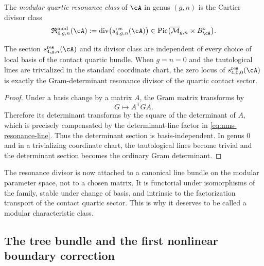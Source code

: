 \begin{definition}
\label{def:nms-modular-quartic-resonance-class}
The \emph{modular quartic resonance class} of $\cA$ in genus $(g,n)$ is the Cartier divisor class
\begin{equation}
\label{eq:nms-modular-resonance-class}
\mathfrak R_{4,g,n}^{\mathrm{mod}}(\cA)
:=
\operatorname{div}\bigl(s_{4,g,n}^{\mathrm{res}}(\cA)\bigr)
\in
\operatorname{Pic}\bigl(\overline{\mathcal M}_{g,n}\times B_{\cA}^{\circ}\bigr).
\end{equation}
\end{definition}

\begin{proposition}
\label{prop:nms-basis-independence-specialization}
The section $s_{4,g,n}^{\mathrm{res}}(\cA)$ and its divisor class are independent of every choice of local basis of the contact quartic bundle. When $g=n=0$ and the tautological lines are trivialized in the standard coordinate chart, the zero locus of $s_{4,0,0}^{\mathrm{res}}(\cA)$ is exactly the Gram-determinant resonance divisor of the quartic contact sector.
\end{proposition}

\begin{proof}
Under a basis change by a matrix $A$, the Gram matrix transforms by
\[
G\longmapsto A^{\mathsf T}GA.
\]
Therefore its determinant transforms by the square of the determinant of $A$, which is precisely compensated by the determinant-line factor in \eqref{eq:nms-resonance-line}. Thus the determinant section is basis-independent. In genus $0$ and in a trivializing coordinate chart, the tautological lines become trivial and the determinant section becomes the ordinary Gram determinant.\qedhere
\end{proof}

\begin{remark}
\label{rem:nms-why-characteristic-class}
The resonance divisor is now attached to a canonical line bundle on the modular parameter space, not to a chosen matrix. It is functorial under isomorphisms of the family, stable under change of basis, and intrinsic to the factorization transport of the contact quartic sector. This is why it deserves to be called a modular characteristic class.
\end{remark}

\subsection{The tree bundle and the first nonlinear boundary correction}
\label{subsec:nms-tree-bundle}

